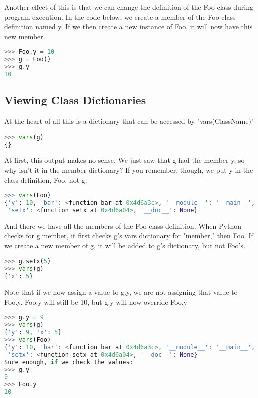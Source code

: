 Another effect of this is that we can change the definition of the Foo class
during program execution. In the code below, we create a member of the Foo class
definition named y. If we then create a new instance of Foo, it will now have
this new member.
\lstset{basicstyle=\scriptsize, numbers=left, captionpos=b, tabsize=4}
\begin{lstlisting}[caption=Add member to Class,language={Python},
xleftmargin=15pt, label=lst:addmembertoclass]
>>> Foo.y = 10
>>> g = Foo()
>>> g.y
10
\end{lstlisting}

\subsection{Viewing Class Dictionaries}
At the heart of all this is a dictionary that can be accessed by
"vars(ClassName)"
\lstset{basicstyle=\scriptsize, numbers=left, captionpos=b, tabsize=4}
\begin{lstlisting}[caption=Dictionary as Heart of all Things,language={Python},
xleftmargin=15pt, label=lst:dictionaryasheartofallthings]
>>> vars(g)
{}
\end{lstlisting}

At first, this output makes no sense. We just saw that g had the member y, so
why isn't it in the member dictionary? If you remember, though, we put y in the
class definition, Foo, not g.
\lstset{basicstyle=\scriptsize, numbers=left, captionpos=b, tabsize=4}
\begin{lstlisting}[caption=Variable of a Class 1,language={Python},
xleftmargin=15pt, label=lst:variableofaclass1]
>>> vars(Foo)
{'y': 10, 'bar': <function bar at 0x4d6a3c>, '__module__': '__main__',
 'setx': <function setx at 0x4d6a04>, '__doc__': None}
\end{lstlisting}

And there we have all the members of the Foo class definition. When Python
checks for g.member, it first checks g's vars dictionary for "member," then Foo.
If we create a new member of g, it will be added to g's dictionary, but not
Foo's.
\lstset{basicstyle=\scriptsize, numbers=left, captionpos=b, tabsize=4}
\begin{lstlisting}[caption=Variable of a Class 2,language={Python},
xleftmargin=15pt, label=lst:variableofaclass2]
>>> g.setx(5)
>>> vars(g)
{'x': 5}
\end{lstlisting}

Note that if we now assign a value to g.y, we are not assigning that value to
Foo.y. Foo.y will still be 10, but g.y will now override Foo.y
\lstset{basicstyle=\scriptsize, numbers=left, captionpos=b, tabsize=4}
\begin{lstlisting}[caption=Variable of a Class 3,language={Python},
xleftmargin=15pt, label=lst:variableofaclass3]
>>> g.y = 9
>>> vars(g)
{'y': 9, 'x': 5}
>>> vars(Foo)
{'y': 10, 'bar': <function bar at 0x4d6a3c>, '__module__': '__main__',
 'setx': <function setx at 0x4d6a04>, '__doc__': None}
Sure enough, if we check the values:
>>> g.y
9
>>> Foo.y
10
\end{lstlisting}

